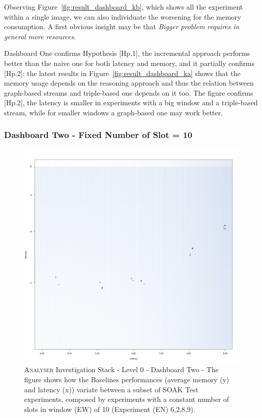 Observing Figure~\ref{fig:result_dashboard_kb}, which shows all the experiment within a single image, we can also individuate the worsening for the memory consumption. A first obvious insight may be that \textit{Bigger problem requires in general more resources}. %

Dashboard One confirms Hypothesis [Hp.1], the incremental approach performs better than the naive one for both latency and memory, and it partially confirms  [Hp.2]: the latest results in Figure~\ref{fig:result_dashboard_ka} shows that the memory usage depends on the reasoning approach and thus the relation between graph-based streams and triple-based one depends on it too. The figure confirms [Hp.2], the latency is smaller in experiments with a big window and a triple-based stream, while for smaller windows a graph-based one may work better.


\subsubsection{Dashboard Two - Fixed Number of Slot = 10}


\begin{figure}[h!tbp]
	\centering
	\includegraphics[width=0.85\linewidth]{images/dashboard-2}	
	\caption[\textsc{Analyser} Investigation Stack - Level 0 - Dashboard Two - Multiplot Version]{\textsc{Analyser} Investigation Stack - Level 0 - Dashboard Two - The figure shows how the Baselines performances (average memory (y) and latency (x)) variate between a subset of SOAK Test experiments, composed by experiments with a constant number of slots in window (EW) of 10 (Experiment (EN) 6,2,8,9).} 	%
	
	\label{fig:result_dashboard_ewb}
\end{figure}

